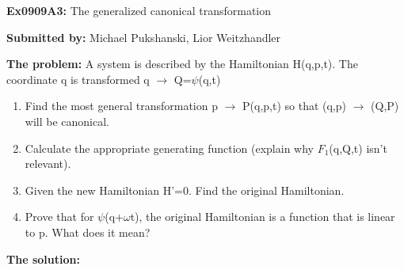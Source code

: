 \documentclass[11pt,fleqn]{article}
\newcommand{\Dn}{\vspace*{3mm}}
\newcommand{\exnumber}[1]{\newcommand{\exnum}{#1}}
\newcommand{\heading}[1]{\begin{center} {\Large {\bf Ex\exnum:} #1} \end{center}}
\newcommand{\auname}[1]{\begin{center} {\bf Submitted by:} #1 \end{center}}
\begin{document}

\exnumber{0909A3}
\heading{The generalized canonical transformation} 
\auname{Michael Pukshanski, Lior Weitzhandler}


{\bf The problem:}
\Dn
A system is described by the Hamiltonian H(q,p,t). The coordinate q is transformed q $\to$ Q=$\psi$(q,t)
\begin{enumerate}
\item Find the most general transformation p $\to$ P(q,p,t) so that (q,p) $\to$ (Q,P) will be canonical.
\item Calculate the appropriate generating function (explain why $F_1$(q,Q,t) isn't relevant).
\item Given the new Hamiltonian H'=0. Find the original Hamiltonian.
\item Prove that for $\psi$(q+$\omega$t), the original Hamiltonian is a function that is linear to p. What does it mean?
\end{enumerate}
\Dn\Dn


{\bf The solution:}
\end{document}
